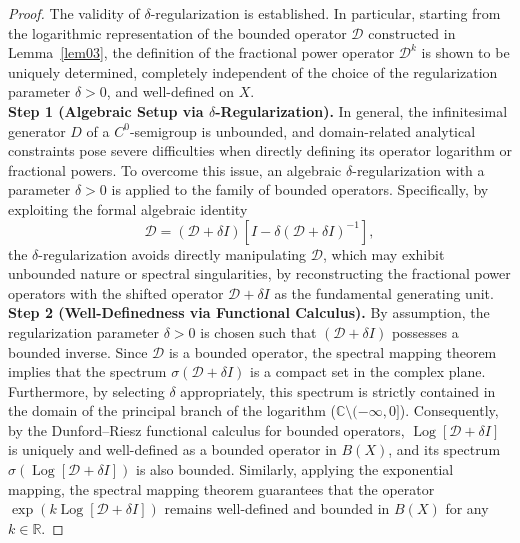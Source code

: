\documentclass[10pt,a4paper]{amsart}
\begin{document}
\begin{proof}
The validity of $\delta$-regularization is established.
In particular, starting from the logarithmic representation of the bounded operator $\mathcal{D}$ constructed in Lemma~\ref{lem03}, the definition of the fractional power operator $\mathcal{D}^k$ is shown to be uniquely determined, completely independent of the choice of the regularization parameter $\delta > 0$, and well-defined on $X$.\vspace{2mm}\\
\noindent\textbf{Step 1 (Algebraic Setup via $\delta$-Regularization).}
In general, the infinitesimal generator $D$ of a $C^0$-semigroup is unbounded, and domain-related analytical constraints pose severe difficulties when directly defining its operator logarithm or fractional powers.
To overcome this issue, an algebraic $\delta$-regularization with a parameter $\delta > 0$ is applied to the family of bounded operators. 
Specifically, by exploiting the formal algebraic identity
\begin{equation} \label{algebraic-decomp}
\mathcal{D} = (\mathcal{D} + \delta I) \left[ I - \delta (\mathcal{D} + \delta I)^{-1} \right],
\end{equation}
the $\delta$-regularization avoids directly manipulating $\mathcal{D}$, which may exhibit unbounded nature or spectral singularities, by reconstructing the fractional power operators with the shifted operator $\mathcal{D} + \delta I$ as the fundamental generating unit.\vspace{2mm}\\
\noindent\textbf{Step 2 (Well-Definedness via Functional Calculus).} 
By assumption, the regularization parameter $\delta > 0$ is chosen such that $(\mathcal{D} + \delta I)$ possesses a bounded inverse. 
Since $\mathcal{D}$ is a bounded operator, the spectral mapping theorem implies that the spectrum $\sigma(\mathcal{D} + \delta I)$ is a compact set in the complex plane. 
Furthermore, by selecting $\delta$ appropriately, this spectrum is strictly contained in the domain of the principal branch of the logarithm ($\mathbb{C} \setminus (-\infty, 0]$). 
Consequently, by the Dunford--Riesz functional calculus for bounded operators, $\operatorname{Log} [\mathcal{D} + \delta I]$ is uniquely and well-defined as a bounded operator in $B(X)$, and its spectrum $\sigma(\operatorname{Log}[\mathcal{D} + \delta I])$ is also bounded. 
Similarly, applying the exponential mapping, the spectral mapping theorem guarantees that the operator $\exp(k \operatorname{Log} [\mathcal{D} + \delta I])$ remains well-defined and bounded in $B(X)$ for any $k \in \mathbb{R}$.

\end{proof}
\end{document}
